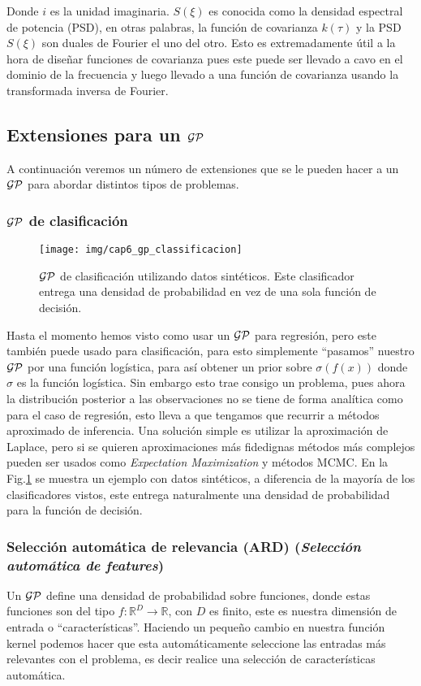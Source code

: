 Donde $i$ es la unidad imaginaria. $S(\xi)$ es conocida como la densidad espectral de potencia (PSD), en otras palabras, la función de covarianza $k(\tau)$ y la PSD $S(\xi)$ son duales de Fourier el uno del otro. Esto es extremadamente útil a la hora de diseñar funciones de covarianza pues este puede ser llevado a cavo en el dominio de la frecuencia y luego llevado a una función de covarianza usando la transformada inversa de Fourier.

\subsection{Extensiones para un $\mathcal{GP}$}
A continuación veremos un número de extensiones que se le pueden hacer a un $\mathcal{GP}$ para abordar distintos tipos de problemas.

\subsubsection{$\mathcal{GP}$ de clasificación}

\begin{wrapfigure}{r}{0.35\textwidth}
\centering
\texttt{[image: img/cap6\_gp\_classificacion]}
\caption{$\mathcal{GP}$ de clasificación utilizando datos sintéticos. Este clasificador entrega una densidad de probabilidad en vez de una sola función de decisión.}\label{fig:gp_8}
\end{wrapfigure} 

Hasta el momento hemos visto como usar un $\mathcal{GP}$ para regresión, pero este también puede usado para clasificación, para esto simplemente ``pasamos'' nuestro $\mathcal{GP}$ por una función logística, para así obtener un prior sobre $\sigma\left(f(x)\right)$ donde $\sigma$ es la función logística. Sin embargo esto trae consigo un problema, pues ahora la distribución posterior a las observaciones no se tiene de forma analítica como para el caso de regresión, esto lleva a que tengamos que recurrir a métodos aproximado de inferencia. Una solución simple es utilizar la aproximación de Laplace, pero si se quieren aproximaciones más fidedignas métodos más complejos pueden ser usados como \textit{Expectation Maximization} y métodos MCMC. En la Fig.\ref{fig:gp_8} se muestra un ejemplo con datos sintéticos, a diferencia de la mayoría de los clasificadores vistos, este entrega naturalmente una densidad de probabilidad para la función de decisión.\\

\subsubsection{Selección automática de relevancia (ARD) (\textit{Selección automática de features})}
Un $\mathcal{GP}$ define una densidad de probabilidad sobre funciones, donde estas funciones son del tipo $f: \mathbb{R}^D \rightarrow \mathbb{R}$, con $D$ es finito, este es nuestra dimensión de entrada o ``características''. Haciendo un pequeño cambio en nuestra función kernel podemos hacer que esta automáticamente seleccione las entradas más relevantes con el problema, es decir realice una selección de características automática.\\

